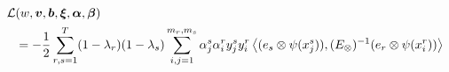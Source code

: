 \begin{equation}\nonumber
    \begin{aligned}
        \mathcal{L} & ({w}, \fv{v}, \fv{b}, \fv{\xi}, {\fv{\alpha}}, \fv{\beta})      \\
                    & = - \frac{1}{2} \sum_{r, s=1}^\ntasks (1-\lambda_r)(1-\lambda_s) \sum_{i, j=1}^{\npertask_r, \npertask_s} \alpha_j^s \alpha_i^r y_j^s y_i^r \dotp{(e_s \otimes \psi(x_j^s))}{(E_\otimes)^{-1} (e_r \otimes \psi(x_i^r))}             \\

\end{aligned}
\end{equation}
